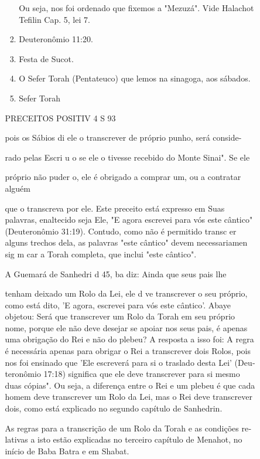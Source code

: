 \begin{itemize}
\begin{enumrate}
\begin{itemize}
\begin{itemize}
\begin{enumerate}
 Ou seja, nos foi ordenado que fixemos a "Mezuzá". Vide Halachot
 Tefilin Cap. 5, lei 7.
 
\item
 
 Deuteronômio 11:20.
 
\item
 
 Festa de Sucot.
 
\item
 
 O Sefer Torah (Pentateuco) que lemos na sinagoga, aos sábados.
 
\item
 
 Sefer Torah
 
\end{enumerate}


PRECEITOS POSITIV 4 S 93

pois os Sábios di ele o transcrever de próprio punho, será conside-

rado pelas Escri u o se ele o tivesse recebido do Monte Sinai". Se ele

próprio não puder o, ele é obrigado a comprar um, ou a contratar alguém

que o transcreva por ele. Este preceito está expresso em Suas palavras,
enalte­cido seja Ele, "E agora escrevei para vós este cântico"
(Deuteronômio 31:19). Contudo, como não é permitido transc er alguns
trechos dela, as palavras "este cântico" devem necessariamen sig m car a
Torah completa, que inclui "este cântico".

A Guemará de Sanhedri d 45, ba diz: Ainda que seus pais lhe

tenham deixado um Rolo da Lei, ele d ve transcrever o seu próprio, como
está dito, 'E agora, escrevei para vós este cântico'. Abaye objetou:
Será que trans­crever um Rolo da Torah em seu próprio nome, porque ele
não deve desejar se apoiar nos seus pais, é apenas uma obrigação do Rei
e não do plebeu? A res­posta a isso foi: A regra é necessária apenas
para obrigar o Rei a transcrever dois Rolos, pois nos foi ensinado que
'Ele escreverá para si o traslado desta Lei' (Deu­teronômio 17:18)
significa que ele deve transcrever para si mesmo duas cópias". Ou seja,
a diferença entre o Rei e um plebeu é que cada homem deve transcre­ver
um Rolo da Lei, mas o Rei deve transcrever dois, como está explicado no
segundo capítulo de Sanhedrin.

As regras para a transcrição de um Rolo da Torah e as condições
re­lativas a isto estão explicadas no terceiro capítulo de Menahot, no
início de Ba­ba Batra e em Shabat.


\end{itemize}
\end{itemize}
\end{enumrate}
\end{itemize}
